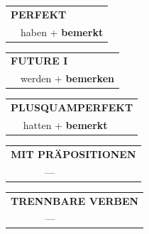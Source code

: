 \documentclass[10pt,a4paper]{revtex4-2}
\begin{document}
\begin{verbbox-acc}
\vspace{10pt}

\begin{tabular}{rl}
\multicolumn{2}{l}{\textbf{PERFEKT}}\\
& haben + \textbf{bemerkt}\\
\end{tabular}
\hfill
\begin{tabular}{rl}
\multicolumn{2}{l}{\textbf{FUTURE I}}\\
& werden + \textbf{bemerken}\\
\end{tabular}
\hfill
\begin{tabular}{rl}
\multicolumn{2}{l}{\textbf{PLUSQUAMPERFEKT}}\\
& hatten + \textbf{bemerkt}\\
\end{tabular}

\vspace{10pt}

\begin{tabular}{lll}
\multicolumn{3}{l}{\textbf{MIT PRÄPOSITIONEN}}\\
& ---\\
\end{tabular}
\hfill
\begin{tabular}{lll}
\multicolumn{3}{l}{\textbf{TRENNBARE VERBEN}}\\
& ---\\
\end{tabular}

\vspace{-5pt}
\end{verbbox-acc}
\end{document}
